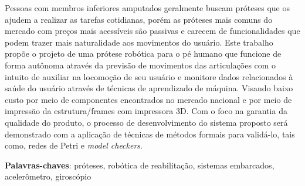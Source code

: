 \documentclass[
    12pt,       %
    oneside,    %
    a4paper,    %
%
    chapter=TITLE,	  	  %
%
    english,			  %
    brazil				  %
%
]{abntex2}
\begin{document}
\setlength{\absparsep}{18pt} %

\begin{resumo}[Resumo]
  Pessoas com membros inferiores amputados geralmente buscam próteses que os ajudem a realizar as tarefas cotidianas, porém as próteses mais comuns do mercado com preços mais acessíveis são passivas e carecem de funcionalidades que podem trazer mais naturalidade aos movimentos do usuário. Este trabalho propõe o projeto de uma prótese robótica para o pé humano que funcione de forma autônoma através da previsão de movimentos das articulações com o intuito de auxiliar na locomoção de seu usuário e monitore dados relacionados à saúde do usuário através de técnicas de aprendizado de máquina. Visando baixo custo por meio de componentes encontrados no mercado nacional e por meio de impressão da estrutura/frames com impressora 3D. Com o foco na garantia da qualidade do produto, o processo de desenvolvimento do sistema proposto será demonstrado com a aplicação de técnicas de métodos formais para validá-lo, tais como, redes de Petri e \textit{model checkers}.

 \vspace{\onelineskip}

 \noindent
 \textbf{Palavras-chaves}: próteses, robótica de reabilitação, sistemas embarcados, acelerômetro, giroscópio
\end{resumo}


  
\end{document}
